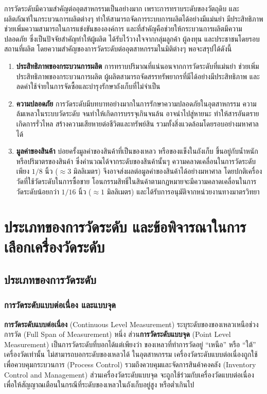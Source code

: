 \documentclass[final,11pt,a4paper]{article}
\begin{document}
การวัดระดับมีความสำคัญต่ออุตสาหกรรมเป็นอย่างมาก เพราะการทราบระดับของวัตถุดิบ และผลิตภัณฑ์ในกระบวนการผลิตต่างๆ
ทำให้สามารถจัดการระบบการผลิตได้อย่างมีแม่นยำ มีประสิทธิภาพ ช่วยเพิ่มความสามารถในการแข่งขันขององค์การ 
และที่สำคัญคือช่วยให้กระบวนการผลิตมีความปลอดภัย ซึ่งเป็นปัจจัยสำคัญทำให้ผู้ผลิต ได้รับไว้วางใจจากกลุ่มลูกค้า ผู้ลงทุน และประชาชนโดยรอบสถานที่ผลิต
โดยความสำคัญของการวัดระดับต่ออุตสาหกรรมในมิติต่างๆ พอจะสรุปได้ดังนี้ 
\begin{enumerate}
    \item \textbf{ประสิทธิภาพของกระบวนการผลิต} การทราบปริมาณที่แน่นอนจากการวัดระดับที่แม่นยำ
    ช่วยเพิ่มประสิทธิภาพของกระบวนการผลิต ผู้ผลิตสามารถจัดสรรทรัพยากรที่มีได้อย่างมีประสิทธิภาพ 
    และลดค่าใช้จ่ายในการจัดซื้อและบำรุงรักษาถังเก็บที่ไม่จำเป็น
    \item \textbf{ความปลอดภัย} การวัดระดับมีบทบาทอย่างมากในการรักษาความปลอดภัยในอุตสาหกรรม
    ความล้มเหลวในระบบวัดระดับ จนทำให้เกิดการบรรจุเกินจนล้น อาจนำไปสู่หายนะ ทำให้สารอันตรายเกิดการรั่วไหล
    สร้างความเสียหายต่อชีวิตและทรัพย์สิน รวมทั้งสิ่งแวดล้อมโดยรอบอย่างมหาศาลได้ 
    \item \textbf{มูลค่าของสินค้า} บ่อยครั้งมูลค่าของสินค้าที่เป็นของเหลว หรือของแข็งในถังเก็บ
    ขึ้นอยู่กับน้ำหนัก หรือปริมาตรของสินค้า ซึ่งคำนวณได้จากระดับของสินค้านั้นๆ 
    ความคลาดเคลื่อนในการวัดระดับเพียง $1/8$ นิ้ว ($\approx 3$ มิลลิเมตร) 
    จึงอาจส่งผลต่อมูลค่าของสินค้าได้อย่างมหาศาล โดยปกติเครื่องวัดที่ใช้วัดระดับในการซื้อขาย
    โอนกรรมสิทธิ์ในสินค้าตามกฏหมายจะมีความคลาดเคลื่อนในการวัดระดับน้อยกว่า  $1/16$ นิ้ว ($\approx 1$ มิลลิเมตร)
    และได้รับการอนุมัติจากหน่วยงานทางมาตรวิทยา
\end{enumerate}
\newpage
\section{ประเภทของการวัดระดับ และข้อพิจารณาในการเลือกเครื่องวัดระดับ}
\subsection{ประเภทของการวัดระดับ}
\subsubsection{การวัดระดับแบบต่อเนื่อง และแบบจุด}
\textbf{การวัดระดับแบบต่อเนื่อง} (Continuous Level Measurement) ระบุระดับของของเหลวเหนือช่วงการวัด (Full Span of Measurement)
หนึ่ง ส่วน\textbf{การวัดระดับแบบจุด} (Point Level Measurement) เป็นการวัดระดับที่บอกได้แต่เพียงว่า ของเหลวที่ทำการวัดอยู่ ``เหนือ'' 
หรือ ``ใต้'' เครื่องวัดเท่านั้น ไม่สามารถบอกระดับของเหลวได้ ในอุตสาหกรรม เครื่องวัดระดับแบบต่อเนื่องถูกใช้เพื่อควบคุมกระบวนการ (Process Control)
รวมถึงควบคุมและจัดการสินค้าคงคลัง (Inventory Control and Management) ส่วนเครื่องวัดระดับแบบจุด จะถูกใช้ร่วมกับเครื่องวัดแบบต่อเนื่อง 
เพื่อให้สัญญาณเตือนในกรณีที่ระดับของเหลวในถังเก็บอยู่สูง หรือต่ำเกินไป
\end{document}
